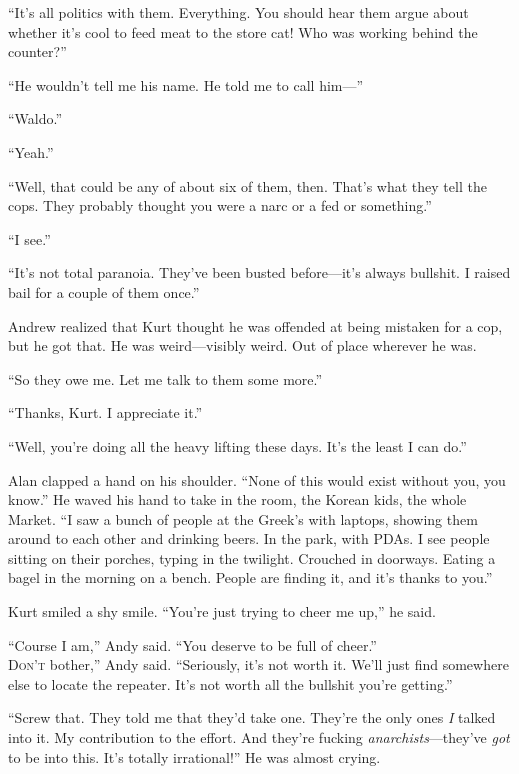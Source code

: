 ``It's all politics with them.  Everything.  You should hear them
argue about whether it's cool to feed meat to the store cat!  Who was
working behind the counter?''

``He wouldn't tell me his name.  He told me to call him---''

``Waldo.''

``Yeah.''

``Well, that could be any of about six of them, then.  That's what
they tell the cops.  They probably thought you were a narc or a fed or
something.''

``I see.''

``It's not total paranoia.  They've been busted before---it's always
bullshit.  I raised bail for a couple of them once.''

Andrew realized that Kurt thought he was offended at being mistaken
for a cop, but he got that.  He was weird---visibly weird.  Out of
place wherever he was.

``So they owe me.  Let me talk to them some more.''

``Thanks, Kurt.  I appreciate it.''

``Well, you're doing all the heavy lifting these days.  It's the least
I can do.''

Alan clapped a hand on his shoulder.  ``None of this would exist
without you, you know.'' He waved his hand to take in the room, the
Korean kids, the whole Market.  ``I saw a bunch of people at the
Greek's with laptops, showing them around to each other and drinking
beers.  In the park, with PDAs.  I see people sitting on their
porches, typing in the twilight.  Crouched in doorways.  Eating a
bagel in the morning on a bench.  People are finding it, and it's
thanks to you.''

Kurt smiled a shy smile.  ``You're just trying to cheer me up,'' he
said.

``Course I am,'' Andy said.  ``You deserve to be full of cheer.''
\\
\lettrine[lines=3, lhang=.5, nindent=0pt, findent=2pt]{D}{on't}
bother,''
Andy said.  ``Seriously, it's not worth it.  We'll
just find somewhere else to locate the repeater.  It's not worth all
the bullshit you're getting.''

``Screw that.  They told me that they'd take one.  They're the only
ones \textit{I} talked into it.  My contribution to the effort.  And
they're fucking \textit{anarchists}---they've \textit{got} to be into
this.  It's totally irrational!'' He was almost crying.

